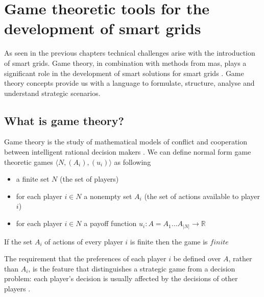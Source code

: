 \section{Game theoretic tools for the development of smart grids}


As seen in the previous chapters technical challenges arise with the introduction of smart grids. Game theory, in combination with methods from \ac{mas}, plays a significant role in the development of smart solutions for smart grids \cite{keypaper}. Game theory concepts provide us with a language to formulate, structure, analyse and understand strategic scenarios.

\subsection{What is game theory?}
Game theory is the study of mathematical models of conflict and cooperation between intelligent rational decision makers \cite{myerson2013game}.
We can define normal form game theoretic games $\langle N, (A_i), (u_i) \rangle$ as following
\begin{itemize}
    \item a finite set $N$ (the set of players)
    \item for each player $i \in N$ a nonempty set $A_i$ (the set of actions available to player $i$)
    \item for each player $i \in N$ a payoff function $u_i: A = A_1 \ldots A_{|N|} \rightarrow \mathbb{R}$
\end{itemize}

If the set $A_i$ of actions of every player $i$ is finite then the game is $finite$

The requirement that the preferences of each player $i$ be defined over $A$, rather than $A_{i}$, is the feature that distinguishes a strategic game from a decision problem: each player's decision is usually affected by the decisions of other players \cite{CourseInGameTheory}.

